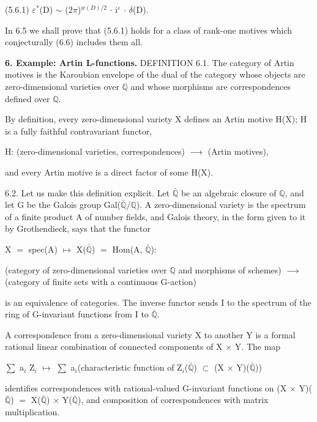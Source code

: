\documentclass[10pt,twoside]{article}
\newcommand{\SectionLead}[1]{\textbf{\color{D030Accent}#1}}
\begin{document}
(5.6.1)    \ensuremath{ε}\ensuremath{^{*}}(D) \ensuremath{∼} (2\ensuremath{π})\ensuremath{^{w(D)/2}} \ensuremath{·} i\ensuremath{^{ε}} \ensuremath{·} \ensuremath{δ}(D).\par
In 6.5 we shall prove that (5.6.1) holds for a class of rank-one motives which conjecturally (6.6) includes them all.\par
\SectionLead{6. Example: Artin L-functions.} DEFINITION 6.1. The category of Artin motives is the Karoubian envelope of the dual of the category whose objects are zero-dimensional varieties over \ensuremath{ℚ} and whose morphisms are correspondences defined over \ensuremath{ℚ}.\par
By definition, every zero-dimensional variety X defines an Artin motive H(X); H is a fully faithful contravariant functor,\par
H: (zero-dimensional varieties, correspondences) \ensuremath{⟶} (Artin motives),\par
and every Artin motive is a direct factor of some H(X).\par
6.2. Let us make this definition explicit. Let \ensuremath{\bar{ℚ}} be an algebraic closure of \ensuremath{ℚ}, and let G be the Galois group Gal(\ensuremath{\bar{ℚ}}/\ensuremath{ℚ}). A zero-dimensional variety is the spectrum of a finite product A of number fields, and Galois theory, in the form given to it by Grothendieck, says that the functor\par
X \ensuremath{=} spec(A) \ensuremath{↦} X(\ensuremath{\bar{ℚ}}) \ensuremath{=} Hom(A, \ensuremath{\bar{ℚ}}):\par
(category of zero-dimensional varieties over \ensuremath{ℚ} and morphisms of schemes) \ensuremath{⟶} (category of finite sets with a continuous G-action)\par
is an equivalence of categories. The inverse functor sends I to the spectrum of the ring of G-invariant functions from I to \ensuremath{\bar{ℚ}}.\par
A correspondence from a zero-dimensional variety X to another Y is a formal rational linear combination of connected components of X \ensuremath{×} Y. The map\par
\ensuremath{∑} a\ensuremath{_{i}} Z\ensuremath{_{i}} \ensuremath{↦} \ensuremath{∑} a\ensuremath{_{i}}(characteristic function of Z\ensuremath{_{i}}(\ensuremath{\bar{ℚ}}) \ensuremath{⊂} (X \ensuremath{×} Y)(\ensuremath{\bar{ℚ}}))\par
identifies correspondences with rational-valued G-invariant functions on (X \ensuremath{×} Y)(\ensuremath{\bar{ℚ}}) \ensuremath{=} X(\ensuremath{\bar{ℚ}}) \ensuremath{×} Y(\ensuremath{\bar{ℚ}}), and composition of correspondences with matrix multiplication.\par
\end{document}
